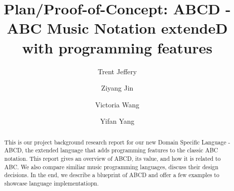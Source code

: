 \documentclass[sigconf]{acmart}
\begin{document}
\title{Plan/Proof-of-Concept: ABCD - ABC Music Notation extendeD with programming features}


\author{Trent Jeffery}

\author{Ziyang Jin}

\author{Victoria Wang}

\author{Yifan Yang}


\begin{abstract}
This is our project background research report for our new Domain Specific Language - ABCD, the extended language that adds programming features to the classic ABC notation. This report gives an overview of ABCD, its value, and how it is related to ABC. We also compare similiar music programming languages, discuss their design decisions. In the end, we describe a blueprint of ABCD and offer a few examples to showcase language implementatiopn.
\end{abstract}




\maketitle





\end{document}
